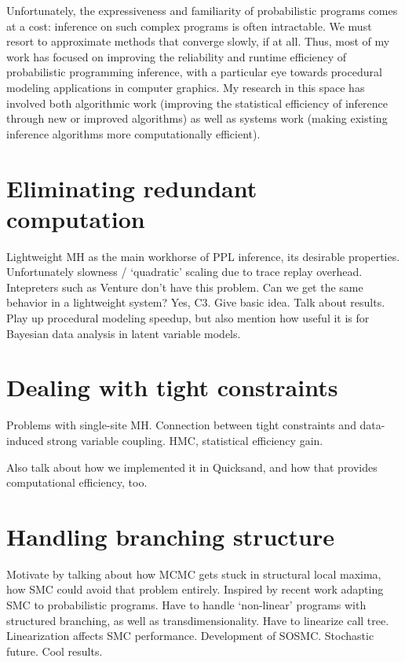 \documentclass[
11pt, %
a4paper, %
oneside, %
headinclude,footinclude, %
BCOR5mm, %
]{scrartcl}
\begin{document}
Unfortunately, the expressiveness and familiarity of probabilistic programs comes at a cost: inference on such complex programs is often intractable. We must resort to approximate methods that converge slowly, if at all. Thus, most of my work has focused on improving the reliability and runtime efficiency of probabilistic programming inference, with a particular eye towards procedural modeling applications in computer graphics. My research in this space has involved both algorithmic work (improving the statistical efficiency of inference through new or improved algorithms) as well as systems work (making existing inference algorithms more computationally efficient).

\section*{Eliminating redundant computation}

Lightweight MH as the main workhorse of PPL inference, its desirable properties. Unfortunately slowness / `quadratic' scaling due to trace replay overhead. Intepreters such as Venture don't have this problem. Can we get the same behavior in a lightweight system? Yes, C3. Give basic idea. Talk about results. Play up procedural modeling speedup, but also mention how useful it is for Bayesian data analysis in latent variable models.

\section*{Dealing with tight constraints}

Problems with single-site MH. Connection between tight constraints and data-induced strong variable coupling. HMC, statistical efficiency gain.

Also talk about how we implemented it in Quicksand, and how that provides computational efficiency, too.

\section*{Handling branching structure}

Motivate by talking about how MCMC gets stuck in structural local maxima, how SMC could avoid that problem entirely. Inspired by recent work adapting SMC to probabilistic programs. Have to handle `non-linear' programs with structured branching, as well as transdimensionality. Have to linearize call tree. Linearization affects SMC performance. Development of SOSMC. Stochastic future. Cool results.
\end{document}

